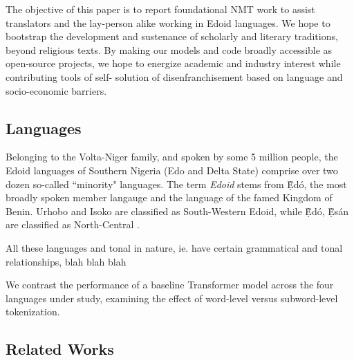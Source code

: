 \documentclass{article} %
\begin{document}
The objective of this paper is to report foundational NMT work to assist translators and the lay-person alike working in Edoid languages. We hope to bootstrap the development and sustenance of scholarly and literary traditions, beyond religious texts. By making our models and code broadly accessible as open-source projects, we hope to energize academic and industry interest while contributing tools of self- solution of disenfranchisement based on language and socio-economic barriers.




\subsection{Languages}
Belonging to the Volta-Niger family, and spoken by some 5 million people, the Edoid languages of Southern Nigeria (Edo and Delta State) comprise over two dozen so-called ``minority" languages. The term \emph{Edoid} stems from \d{\`E}d{\'o}, the most broadly spoken member langauge and the language of the famed Kingdom of Benin. Urhobo and Isoko are classified as South-Western Edoid, while \d{\`E}d{\'o}, \d{\`E}s{\'a}n are classified as North-Central \citep{wikiedoid}.

All these languages and tonal in nature, ie. have certain grammatical and tonal relationships, blah blah blah

We contrast the performance of a baseline Transformer model across the four languages under study, examining the effect of word-level versus subword-level tokenization.



\subsection{Related Works}
\end{document}
